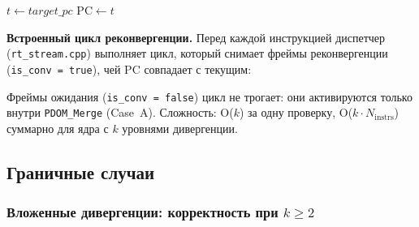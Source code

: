 \begin{algorithm}[H]
  \caption{PDOM\_Merge --- безусловный \texttt{bra \$L} при непустом стеке}
  \label{alg:pdom_merge}
  $t \leftarrow \mathit{target\_pc}$\;
  $\mathrm{PC} \leftarrow t$
\end{algorithm}

\textbf{Встроенный цикл реконвергенции.}
Перед каждой инструкцией диспетчер (\texttt{rt\_stream.cpp}) выполняет
цикл, который снимает фреймы реконвергенции (\texttt{is\_conv = true}),
чей PC совпадает с текущим:

\begin{algorithm}[H]
  \caption{Встроенный цикл реконвергенции (rt\_stream.cpp)}
  \label{alg:conv_check}
\end{algorithm}

Фреймы ожидания (\texttt{is\_conv = false}) цикл не трогает:
они активируются только внутри \texttt{PDOM\_Merge} (Case~A).
Сложность: O($k$) за одну проверку, O($k \cdot N_{\mathrm{instrs}}$)
суммарно для ядра с $k$ уровнями дивергенции.

\subsection{Граничные случаи}

\subsubsection{Вложенные дивергенции: корректность при $k \geq 2$}

